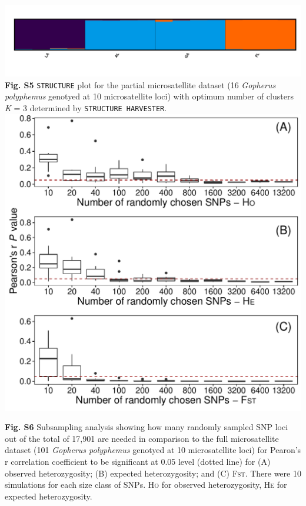 \documentclass[english]{article}\usepackage[]{graphicx}\usepackage[]{color}
\makeatletter
\def\maxwidth{ %
  \ifdim\Gin@nat@width>\linewidth
    \linewidth
  \else
    \Gin@nat@width
  \fi
}
\newenvironment{knitrout}{}{} %
\makeatother
\begin{document}
\pagebreak{}
\noindent
\includegraphics [scale=1.0]{K3MajorCluster}
\noindent
\textbf{Fig. S5} \texttt{STRUCTURE} plot for the partial microsatellite dataset (16 \textit{Gopherus polyphemus} genotyed at 10 microsatellite loci) with optimum number of clusters \textit{K} = 3 determined by \texttt{STRUCTURE HARVESTER}.\\

\pagebreak{}
\noindent
\begin{knitrout}
\color{fgcolor}
\includegraphics[width=\maxwidth]{figure/Figure-S6-1} 

\end{knitrout}
\noindent
\textbf{Fig. S6} Subsampling analysis showing how many randomly sampled SNP loci out of the total of 17,901 are needed in comparison to the full microsatellite dataset (101 \textit{Gopherus polyphemus} genotyed at 10 microsatellite loci) for Pearon's r correlation coefficient to be significant at 0.05 level (dotted line) for (A) observed heterozygosity; (B) expected heterozygosity; and (C) \textsc{Fst}. There were 10 simulations for each size class of SNPs. \textsc{Ho} for observed heterozygosity, \textsc{He} for expected heterozygosity.\\
\end{document}
